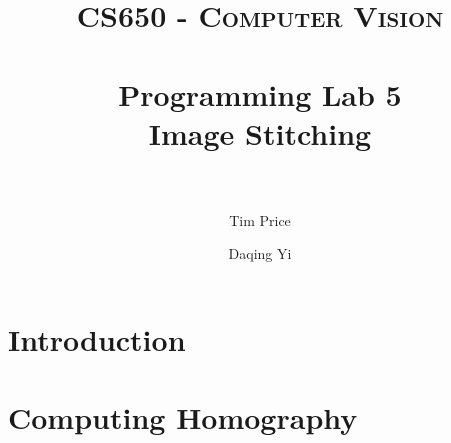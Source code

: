 \documentclass[paper=a4, fontsize=11pt]{scrartcl}
\title{
		\usefont{OT1}{bch}{b}{n}
		\normalfont \normalsize \textsc{CS650 - Computer Vision} \\ [25pt]
		\horrule{0.5pt} \\[0.4cm]
		\huge Programming Lab 5 \\ Image Stitching \\
		\horrule{2pt} \\[0.5cm]
}
\author{
		\normalfont %
        Tim Price \and Daqing Yi \\
}
\begin{document}
\maketitle

\section{Introduction}

\section{Computing Homography}
\end{document}
